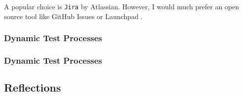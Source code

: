 A popular choice is \texttt{Jira}\cite{tools:jira} by Atlassian. However, I would much
prefer an open source tool like GitHub Issues\cite{tools:github-issues} or
Launchpad \cite{tools:launchpad}.

\subsubsection{Dynamic Test Processes}

\subsubsection{Dynamic Test Processes}

\subsection{Reflections}\label{task-1c-reflect}


